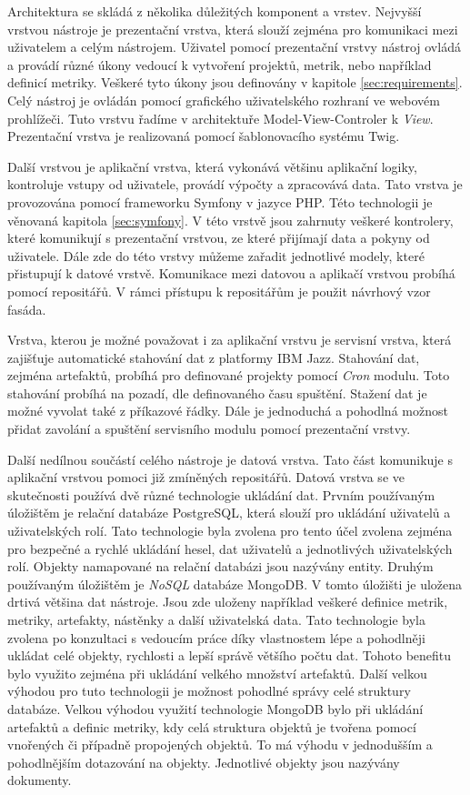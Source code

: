 \documentclass[czech,master,public,dept460,male,cpdeclaration,oneside]{diploma}
\begin{document}
Architektura se skládá z několika důležitých komponent a vrstev. Nejvyšší vrstvou nástroje je prezentační vrstva, která slouží zejména pro komunikaci mezi uživatelem a celým nástrojem. Uživatel pomocí prezentační vrstvy nástroj ovládá a provádí různé úkony vedoucí k vytvoření projektů, metrik, nebo například definicí metriky. Veškeré tyto úkony jsou definovány v kapitole \ref{sec:requirements}. Celý nástroj je ovládán pomocí grafického uživatelského rozhraní ve webovém prohlížeči. Tuto vrstvu řadíme v architektuře Model-View-Controler k \textit{View}. Prezentační vrstva je realizovaná pomocí šablonovacího systému Twig.

Další vrstvou je aplikační vrstva, která vykonává většinu aplikační logiky, kontroluje vstupy od uživatele, provádí výpočty a zpracovává data. Tato vrstva je provozována pomocí frameworku Symfony v jazyce PHP. Této technologii je věnovaná kapitola \ref{sec:symfony}. V této vrstvě jsou zahrnuty veškeré kontrolery, které komunikují s prezentační vrstvou, ze které přijímají data a pokyny od uživatele. Dále zde do této vrstvy můžeme zařadit jednotlivé modely, které přistupují k datové vrstvě. Komunikace mezi datovou a aplikačí vrstvou probíhá pomocí repositářů. V rámci přístupu k repositářům je použit návrhový vzor fasáda. 

Vrstva, kterou je možné považovat i za aplikační vrstvu je servisní vrstva, která zajišťuje automatické stahování dat z platformy IBM Jazz. Stahování dat, zejména artefaktů, probíhá pro definované projekty pomocí \textit{Cron} modulu. Toto stahování probíhá na pozadí, dle definovaného času spuštění. Stažení dat je možné vyvolat také z příkazové řádky. Dále je jednoduchá a pohodlná možnost přidat zavolání a spuštění servisního modulu pomocí prezentační vrstvy.

Další nedílnou součástí celého nástroje je datová vrstva. Tato část komunikuje s aplikační vrstvou pomoci již zmíněných repositářů. Datová vrstva se ve skutečnosti používá dvě různé technologie ukládání dat. Prvním používaným úložištěm je relační databáze PostgreSQL, která slouží pro ukládání uživatelů a uživatelských rolí. Tato technologie byla zvolena pro tento účel zvolena zejména pro bezpečné a rychlé ukládání hesel, dat uživatelů a jednotlivých uživatelských rolí. Objekty namapované na relační databázi jsou nazývány entity. Druhým používaným úložištěm je \textit{NoSQL} databáze MongoDB. V tomto úložišti je uložena drtivá většina dat nástroje. Jsou zde uloženy například veškeré definice metrik, metriky, artefakty, nástěnky a další uživatelská data. Tato technologie byla zvolena po konzultaci s vedoucím práce díky vlastnostem lépe a pohodlněji ukládat celé objekty, rychlosti a lepší správě většího počtu dat. Tohoto benefitu bylo využito zejména při ukládání velkého množství artefaktů. Další velkou výhodou pro tuto technologii je možnost pohodlné správy celé struktury databáze. Velkou výhodou využití technologie MongoDB bylo při ukládání artefaktů a definic metriky, kdy celá struktura objektů je tvořena pomocí vnořených či případně propojených objektů. To má výhodu v jednodušším a pohodlnějším dotazování na objekty. Jednotlivé objekty jsou nazývány dokumenty.
 
\end{document}
